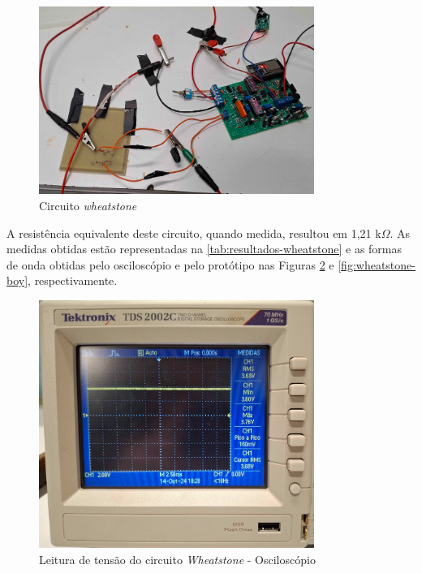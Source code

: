 \begin{figure}[htb!]
    \caption{Circuito \textit{wheatstone}}
    \label{fig:circuito-wheatstone-full}
    \includegraphics[width=0.8\textwidth]{figuras/circuito-wheatstone-full.png}
    \fonte{}
\end{figure}

A resistência equivalente deste circuito, quando medida, resultou em 1,21 k$\Omega$. As medidas obtidas estão representadas na \autoref{tab:resultados-wheatstone} e as formas de onda obtidas pelo osciloscópio e pelo protótipo nas Figuras \ref{fig:wheatstone-osc} e \ref{fig:wheatstone-boy}, respectivamente.

\begin{figure}[htb!]
    \caption{Leitura de tensão do circuito \textit{Wheatstone} - Osciloscópio}
    \label{fig:wheatstone-osc}
    \includegraphics[width=0.8\textwidth]{figuras/wheatstone-osc.png}
    \fonte{}
\end{figure}

